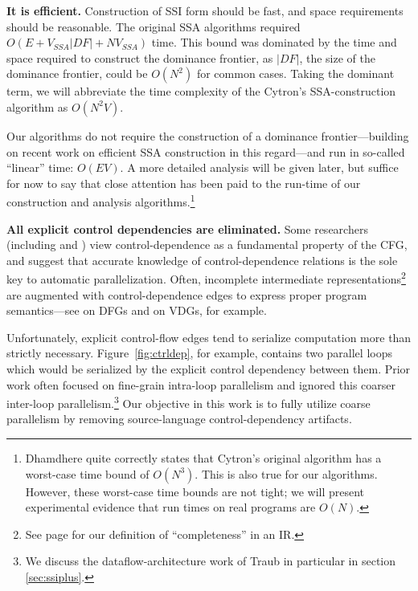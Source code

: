 \documentclass[12pt,titlepage,twoside]{article}
\begin{document}
\textbf{It is efficient.}  Construction of SSI form should be fast,
and space requirements should be reasonable.  The original SSA
algorithms required $O(E+V_{SSA}|{DF}|+NV_{SSA})$ time.  This bound
was dominated by the time and space required to construct the
dominance frontier, as $|{DF}|$, the size of the dominance frontier,
could be $O(N^2)$ for common cases.  Taking the dominant term, we will
abbreviate the time complexity of the Cytron's SSA-construction
algorithm as $O(N^2 V)$.

Our algorithms do not require the construction of a dominance
frontier---building on recent work on efficient SSA construction in
this regard---and run in so-called ``linear'' time: $O(EV)$.  A more
detailed analysis will be given later, but suffice for now to say that
close attention has been paid to the run-time of our construction and
analysis algorithms.\footnote{Dhamdhere \cite{dhamdhere92:large} quite
correctly states that Cytron's original algorithm has a worst-case
time bound of $O(N^3)$.  This is also true for our algorithms.
However, these worst-case time bounds are not tight; we will present
experimental evidence that run times on real programs are $O(N)$.}
       

\textbf{All explicit control dependencies are eliminated.}
Some researchers (including \cite{appel:modern} and
\cite{pingali97:apt}) view control-dependence as a fundamental
property of the CFG, and \cite{ballance90:pdw,appel:modern} suggest
that accurate knowledge of control-dependence relations is the sole
key to automatic parallelization.  Often, incomplete intermediate
representations\footnote{See page \pageref{sec:complete} for our
definition of ``completeness'' in an IR.} are augmented with
control-dependence edges to express proper program semantics---see
\cite{johnson93:dfg} on DFGs and \cite{weise94:vdg} on VDGs, for
example.

Unfortunately, explicit control-flow edges tend to serialize
computation more than strictly necessary.  Figure~\vref{fig:ctrldep},
for example, contains two parallel loops which would be serialized by
the explicit control dependency between them.  Prior work often
focused on fine-grain intra-loop parallelism and ignored this coarser
inter-loop parallelism.\footnote{We discuss the dataflow-architecture
work of Traub \cite{traub86:ttda} in particular in section
\ref{sec:ssiplus}.} Our objective in this work is to fully utilize
coarse parallelism by removing source-language control-dependency artifacts.
\end{document}

